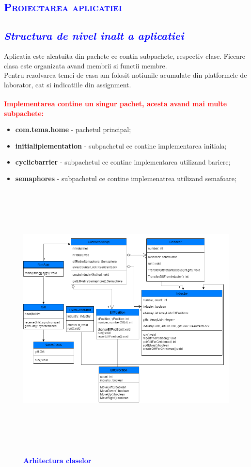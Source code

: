 \documentclass{article}
\begin{document}
\newpage   
\begin{center}
     \textcolor{blue}{\section{\bfseries\scshape\textcolor{blue}{Proiectarea aplicatiei}}}
\end{center}
\vspace{10mm}
 \textcolor{blue}{\subsection{\itshape \textcolor{blue}{Structura de nivel inalt a aplicatiei }}}
\vspace{15mm}
Aplicatia este alcatuita din pachete ce contin subpachete, respectiv clase. Fiecare clasa este organizata avand membrii si functii membre.\\ Pentru rezolvarea temei de casa am folosit notiunile acumulate din platformele de laborator, cat si indicatiile din assignment.\\\\
\textcolor{red}{\bfseries Implementarea contine un singur pachet, acesta avand mai multe subpachete:}
\begin{itemize}
    \item \textbf{com.tema.home} - pachetul principal;
    \item \textbf{initialiplementation} - subpachetul ce contine implementarea initiala;
    \item \textbf{cyclicbarrier} - subpachetul ce contine implementarea utilizand bariere;
    \item \textbf{semaphores} - subpachetul ce contine implemenatrea utilizand semafoare;
\end{itemize}
\begin{figure}
   \centering
   \includegraphics[width=14cm, height=14cm]{Arhitecture.png}
   \bfseries\caption{\textbf{\textcolor{blue}{Arhitectura claselor}}}
\end{figure}
\end{document}
